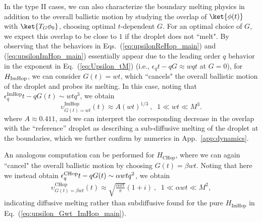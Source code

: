 \documentclass[prx,letterpaper,aps,superscriptaddress,floatfix,twocolumn,nofootinbib]{revtex4-2}
\theoremstyle{definition}
\begin{document}
%
%
In the type II cases, we can also characterize the boundary melting physics in addition to the overall ballistic motion by studying the overlap of $\ket{\phi(t)}$ with $\ket{T_G\phi_0}$, choosing optimal $t$-dependent $G$.
%
For an optimal choice of $G$, we expect this overlap to be close to $1$ if the droplet does not ``melt". 
%
By observing that the behaviors in Eqs.~(\ref{eq:upsilonReHop_main}) and (\ref{eq:upsilonImHop_main}) essentially appear due to the leading order $q$ behavior in the exponent in Eq.~(\ref{eq:Upsilon_tM}) (i.e., $\epsilon_q t - qG \approx w q t$ at $G=0$), for $H_{\rm ImHop}$, we can consider $G(t) = wt$, which ``cancels" the overall ballistic motion of the droplet and probes its melting. 
%
In this case, noting that $\epsilon_q^{\text{ImHop}} t - q G(t) \sim w t q^3$, we obtain
\begin{equation}
\upsilon_{G(t)=wt}^{\text{ImHop}}(t) \approx  A (wt)^{1/3} ~,\;\;1 \ll wt \ll M^3.
\label{eq:upsilon_Gwt_ImHop_main}
\end{equation}
where $A \approx 0.411$, and we can interpret the corresponding decrease in the overlap with the ``reference'' droplet as describing a sub-diffusive melting of the droplet at the boundaries, which we further confirm by numerics in App.~\ref{app:dynamics}.
%

%
An analogous computation can be performed for  $H_{\text{CHop}}$, where we can again ``cancel" the overall ballistic motion by choosing $G(t) = \beta w t$.
%
Noting that here we instead obtain $\epsilon_q^{\rm CHop} t - q G(t) \sim \alpha w t q^2$, we obtain 
\begin{align}
\upsilon^{\text{CHop}}_{G(t)=\beta w t}(t) \approx \sqrt{\frac{\alpha wt}{\pi}} (1 + i) ~,\;\;1 \ll \alpha wt \ll M^2, 
\label{eq:upsilon_G_CHop_main}
\end{align}
indicating diffusive melting rather than subdiffusive found for the pure $H_{\text{ImHop}}$ in Eq.~(\ref{eq:upsilon_Gwt_ImHop_main}).
%

%
\end{document}
